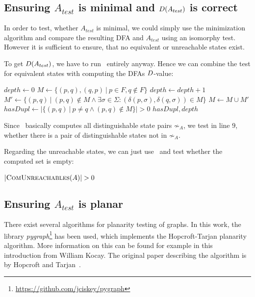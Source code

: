 \subsection{Ensuring $A_{test}$ is minimal and $D(A_{test})$ is correct}

In order to test, whether $A_{test}$ is minimal, we could simply use the minimization algorithm and compare the resulting DFA and $A_{test}$ using an isomorphy test. However it is sufficient to ensure, that no equivalent or unreachable states exist.

To get $D(A_{test})$, we have to run \CompDist\ entirely anyway. Hence we can combine the test for equivalent states with computing the DFAs $D$-value:
\vspace{0.2cm}
\begin{algorithmic}[1]
		\State $depth \gets 0$
		\State $M \gets \{ (p,q), (q,p)\ |\ p \in F, q \notin F \}$
		\Do
			\State $depth \gets depth + 1$
			\State $M' \gets \{ (p,q)\ |\ (p,q) \notin M \land \exists \sigma \in \Sigma \colon (\delta(p,\sigma), \delta(q,\sigma)) \in M \}$
			\State $M \gets M \cup M'$
		\State $hasDupl \gets | \{ (p,q)\ |\ p \neq q \land (p,q) \notin M \} | > 0$
		\State \Return $hasDupl, depth$
	\EndFunction
\end{algorithmic}
\vspace{0.2cm}
Since \CompDist\ basically computes all distinguishable state pairs $\not\sim_A$, we test in line $9$, whether there is a pair of distinguishable states not in $\not\sim_A$.

Regarding the unreachable states, we can just use \CompUnr\ and test whether the computed set is empty:
\vspace{0.2cm}
\begin{algorithmic}[1]
	\State \Return $|\textsc{ComUnreachables}(A)| > 0$
	\EndFunction
\end{algorithmic}

\subsection{Ensuring $A_{test}$ is planar}

There exist several algorithms for planarity testing of graphs. In this work, the library \emph{pygraph}\footnote{\url{https://github.com/jciskey/pygraph}} has been used, which implements the Hopcroft-Tarjan planarity algorithm. More information on this can be found for example in this~\cite{Koc93} introduction from William Kocay. The original paper describing the algorithm is by Hopcroft and Tarjan~\cite{HT74}.

